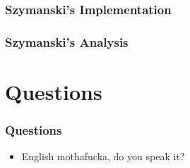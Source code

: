 \documentclass[t, pdftex]{beamer}
\begin{document}
\begin{frame}
  \frametitle{Szymanski's Implementation}
  \begin{multicols*}{3}
    
  \end{multicols*}
\end{frame}

\begin{frame}
  \frametitle{Szymanski's Analysis}
  
\end{frame}

\section{Questions}
\begin{frame}[c]
    \frametitle{Questions}  %
    \begin{itemize}
        \item English mothafucka, do you speak it?
    \end{itemize}
\end{frame}


\end{document}
